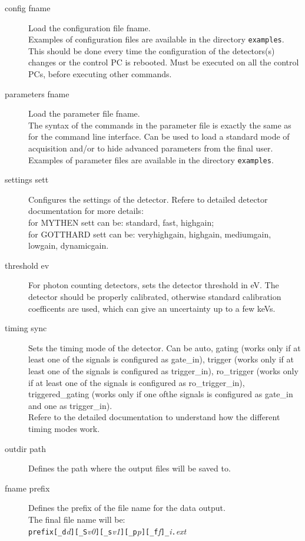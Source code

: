 \documentclass{article}
\begin{document}
\begin{description}
\item[config fname] 
Load the configuration file fname. \\
Examples of configuration files are available in the directory \verb=examples=. This should be done every time the configuration of the detectors(s) changes or the control PC is rebooted. Must be executed on all the control PCs, before executing other commands.
\item[parameters fname] 
Load the parameter file fname. \\
The syntax of the commands in the parameter file is exactly the same as for the command line interface. Can be used to load a standard mode of acquisition and/or to hide advanced parameters from the final user. Examples of parameter files are available in the directory \verb=examples=.     
\item[settings sett] 
Configures the settings of the detector. Refere to detailed detector documentation for more details:   \\
for MYTHEN sett can be: standard, fast, highgain;\\
for GOTTHARD sett can be: veryhighgain, highgain, mediumgain, lowgain, dynamicgain.
\item[threshold ev] 
For photon counting detectors, sets the detector threshold in eV. The detector should be properly calibrated, otherwise standard calibration coefficents are used, which can give an uncertainty up to a few keVs.  
\item[timing sync]   
Sets the timing mode of the detector. Can be auto, gating (works only if at least one of the signals is configured as gate\_in), trigger (works only if at least one of the signals is configured as trigger\_in), ro\_trigger (works only if at least one of the signals is configured as ro\_trigger\_in), triggered\_gating (works only if one ofthe signals is configured as gate\_in and one as trigger\_in). \\
Refere to the detailed documentation to understand how the different timing modes work.
\item[outdir path] 
Defines the path where the output files will be saved to.
\item[fname prefix]
Defines the prefix of the file name for the data output. \\
The final file name will be: \\
\verb=prefix[_d=\textit{d}\verb=][_S=\textit{v0}\verb=][_s=\textit{v1}\verb=][_p=\textit{p}\verb=][_f=\textit{f}\verb=]_=\textit{i}\verb=.=\textit{ext}\\

\end{description}
\end{document}
